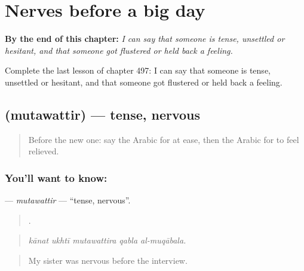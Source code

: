 
\chapter{Nerves before a big day}
\label{ch:ar-nerves-before-a-big-day}

\begin{chapteropening}
\textbf{By the end of this chapter:} \emph{I can say that someone is tense, unsettled or hesitant, and that someone got flustered or held back a feeling.}

Complete the last lesson of chapter 497: I can say that someone is tense, unsettled or hesitant, and that someone got flustered or held back a feeling.
\end{chapteropening}

\section[\texorpdfstring{\ar{متوتر} (mutawattir)}{متوتر (mutawattir)}]{ (mutawattir) — tense, nervous}

\label{lesson:AR-C497-mutawattir}



\begin{quote}
Before the new one: say the Arabic for at ease, then the Arabic for to feel relieved.
\end{quote}

\subsection*{You'll want to know: }
\textbf{} — \emph{mutawattir} — \textquotedblleft{}tense, nervous\textquotedblright{}.

\begin{quote}
    .
\end{quote}

\begin{quote}
\emph{kānat ukhtī mutawattira qabla al-muqābala.}
\end{quote}

\begin{quote}
My sister was nervous before the interview.
\end{quote}

